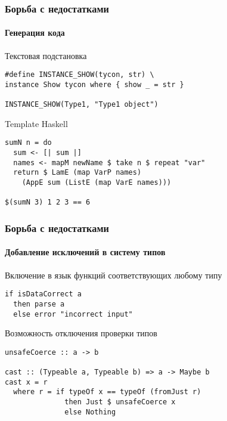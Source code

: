 \documentclass[ucs]{beamer}
\begin{document}

\begin{frame}[fragile]
  \frametitle{Борьба с недостатками}
  \framesubtitle{Генерация кода}

  \begin{block}{Текстовая подстановка}
\begin{verbatim}
#define INSTANCE_SHOW(tycon, str) \
instance Show tycon where { show _ = str }

INSTANCE_SHOW(Type1, "Type1 object")
\end{verbatim}
  \end{block}

  \begin{block}{Template Haskell}
\begin{verbatim}
sumN n = do
  sum <- [| sum |]
  names <- mapM newName $ take n $ repeat "var"
  return $ LamE (map VarP names)
    (AppE sum (ListE (map VarE names)))

$(sumN 3) 1 2 3 == 6
\end{verbatim}
  \end{block}
\end{frame}

\begin{frame}[fragile]
  \frametitle{Борьба с недостатками}
  \framesubtitle{Добавление исключений в систему типов}

  \begin{block}{Включение в язык функций соответствующих любому типу}
\begin{verbatim}
if isDataCorrect a
  then parse a
  else error "incorrect input"
\end{verbatim}
  \end{block}

  \begin{block}{Возможность отключения проверки типов}
\begin{verbatim}
unsafeCoerce :: a -> b

cast :: (Typeable a, Typeable b) => a -> Maybe b
cast x = r
  where r = if typeOf x == typeOf (fromJust r)
              then Just $ unsafeCoerce x
              else Nothing
\end{verbatim}
  \end{block}
\end{frame}

\end{document}
